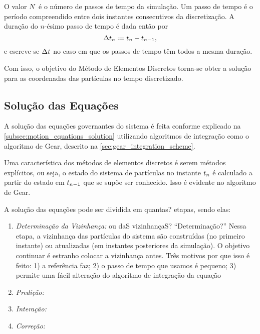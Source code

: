 O valor \(\numberOfTimesteps\) é o número de passos de tempo da simulação. Um passo de tempo é o período compreendido entre dois instantes consecutivos da discretização. A duração do \(n\)-ésimo passo de tempo é dada então por
\begin{equation*}
	\Dt[n] \eqdef \instant[n] - \instant[n-1],
\end{equation*}
e escreve-se \(\Dt\) no caso em que os passos de tempo têm todos a mesma duração.

Com isso, o objetivo do Método de Elementos Discretos torna-se obter a solução para as coordenadas das partículas no tempo discretizado.

\subsection{Solução das Equações}

A solução das equações governantes do sistema é feita conforme explicado na \autoref{subsec:motion_equations_solution} utilizando algoritmos de integração como o algoritmo de Gear, descrito na \autoref{sec:gear_integration_scheme}.

Uma característica dos métodos de elementos discretos é serem métodos explícitos, ou seja, o estado do sistema de partículas no instante \(\instant[n]\) é calculado a partir do estado em \(\instant[n-1]\) que se supõe ser conhecido. Isso é evidente no algoritmo de Gear.

A solução das equações pode ser dividida em \alert{quantas?} etapas, sendo elas:

\begin{enumerate}
	\item \textit{Determinação da Vizinhança:} \alert{ou daS vizinhançaS?} \alert{``Determinação?''} Nessa etapa, a vizinhança das partículas do sistema são construídas (no primeiro instante) ou atualizadas (em instantes posteriores da simulação). O objetivo \alert{continuar} \alert{é estranho colocar a vizinhança antes. Três motivos por que isso é feito: 1) a referência faz; 2) o passo de tempo que usamos é pequeno; 3) permite uma fácil alteração do algoritmo de integração da equação}
	\item \textit{Predição:} 
	\item \textit{Interação:}
	\item \textit{Correção:}
\end{enumerate}

